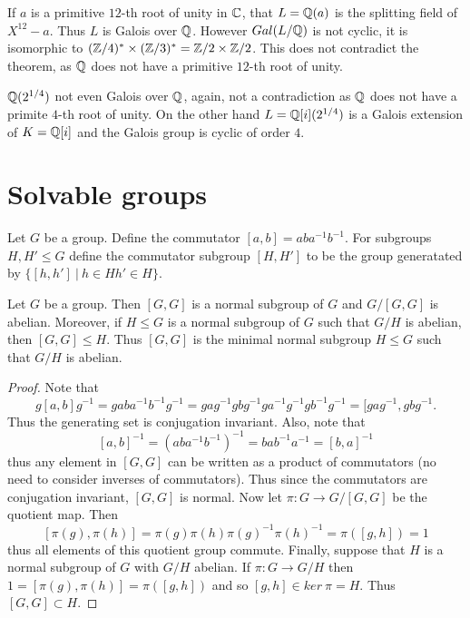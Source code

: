 \documentclass[twoside, a4paper, 10pt]{amsart}
\begin{document}
\begin{eg} If $a$ is a primitive $12$-th root of unity in $\mathbb{C}$, that $L = \mathbb{Q}(a)$ is the splitting field of $X^{12} - a$. Thus $L$ is Galois over $\mathbb{Q}$. However $Gal(L/\mathbb{Q})$ is not cyclic, it is isomorphic to $(\mathbb{Z}/4)^* \times (\mathbb{Z}/3)^* = \mathbb{Z}/2 \times \mathbb{Z}/2$. This does not contradict the theorem, as $\mathbb{Q}$ does not have a primitive $12$-th root of unity.\end{eg}

\begin{eg} $\mathbb{Q}(2^{1/4})$ not even Galois over $\mathbb{Q}$, again, not a contradiction as $\mathbb{Q}$ does not have a primite $4$-th root of unity. On the other hand $L = \mathbb{Q}[i](2^{1/4})$ is a Galois extension of $K = \mathbb{Q}[i]$ and the Galois group is cyclic of order $4$. 

\end{eg}

\section{Solvable groups}

\begin{mydef} Let $G$ be a group. Define the commutator $[a,b] = aba^{-1}b^{-1}$. For subgroups $H, H' \leq G$ define the commutator subgroup $[H,H']$ to be the group generatated by $\{[h,h'] ~|~ h \in H h' \in H\}$.

\end{mydef}

\begin{prop} Let $G$ be a group. Then $[G,G]$ is a normal subgroup of $G$ and $G/[G,G]$ is abelian. Moreover, if $H \leq G$ is a normal subgroup of $G$ such that $G/H$ is abelian, then $[G,G] \leq H$. Thus $[G,G]$ is the minimal normal subgroup $H \leq G$ such that $G/H$ is abelian.

\end{prop}

\begin{proof} Note that $$g[a,b]g^{-1} = gaba^{-1}b^{-1}g^{-1} =  gag^{-1}gbg^{-1}ga^{-1}g^{-1}gb^{-1}g^{-1} = [gag^{-1}, gbg^{-1}. $$ Thus the generating set is conjugation invariant. Also, note that $$[a,b]^{-1} = (aba^{-1}b^{-1})^{-1} = bab^{-1}a^{-1} = [b,a]^{-1}$$ thus any element in $[G,G]$ can be written as a product of commutators (no need to consider inverses of commutators). Thus since the commutators are conjugation invariant, $[G,G]$ is normal. Now let $\pi:G \to G/[G,G]$ be the quotient map. Then $$[\pi(g), \pi(h)] = \pi(g)\pi(h)\pi(g)^{-1}\pi(h)^{-1} = \pi([g,h]) = 1$$ thus all elements of this quotient group commute. Finally, suppose that $H$ is a normal subgroup of $G$ with $G/H$ abelian. If $\pi:G \to G/H$ then $1 = [\pi(g), \pi(h)] = \pi([g,h])$ and so $[g,h] \in ker~\pi = H$. Thus $[G,G] \subset H$. \end{proof}
\end{document}
